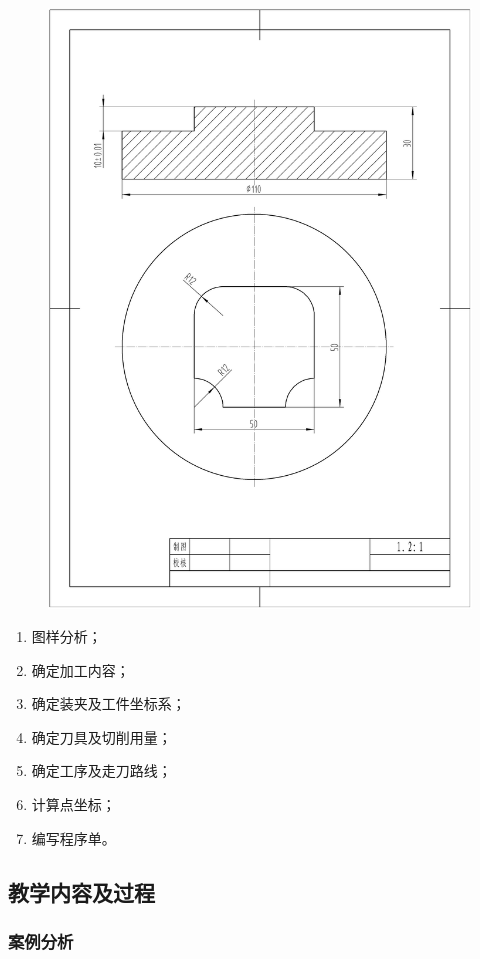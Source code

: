 \begin{figure}[h]
    \centering
    \includegraphics[width=0.8\linewidth,trim=50 150 50 100,clip]{data/image/5-1.jpg}
    \caption{}
    \label{fig:4-1}
\end{figure}

\begin{enumerate}[1、]
    \item 图样分析；
    \item 确定加工内容；
    \item 确定装夹及工件坐标系；
    \item 确定刀具及切削用量；
    \item 确定工序及走刀路线；
    \item 计算点坐标；
    \item 编写程序单。
\end{enumerate}

\subsection{教学内容及过程}

\subsubsection{案例分析}

